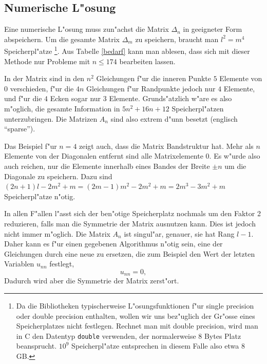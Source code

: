 \subsection{Numerische L"osung}
Eine numerische L"osung
muss zun"achst die Matrix $\Delta_n$ in geeigneter Form abspeichern.
Um die gesamte Matrix $\Delta_m$ zu speichern, braucht man $l^2=m^4$
Speicherpl"atze%
\footnote{Da die Bibliotheken typischerweise
L"osungsfunktionen f"ur single precision oder double precision
enthalten, wollen wir uns bez"uglich der Gr"osse eines Speicherplatzes
nicht festlegen. Rechnet man mit double precision, wird man in C
den Datentyp {\tt double} verwenden, der normalerweise 8 Bytes Platz
beansprucht. $10^9$ Speicherpl"atze entsprechen in diesem Falle also
etwa 8 GB.}.  Aus Tabelle \ref{bedarf} kann man ablesen, dass sich mit
dieser Methode nur Probleme mit $n\le 174$ bearbeiten lassen.

In der Matrix sind in den $n^2$ Gleichungen f"ur die inneren Punkte
$5$ Elemente von $0$ verschieden, f"ur die $4n$ Gleichungen f"ur
Randpunkte jedoch nur $4$ Elemente, und f"ur die $4$ Ecken sogar nur $3$
Elemente. Grunds"atzlich w"are es also m"oglich, die gesamte Information
in $ 5n^2+16n+12$ Speicherpl"atzen unterzubringen.  Die Matrizen $A_n$
sind also extrem d"unn besetzt (englisch ``sparse'').

Das Beispiel f"ur $n=4$ zeigt auch, dass die Matrix Bandstruktur hat. Mehr
als $n$ Elemente von der Diagonalen entfernt sind alle Matrixelemente
$0$. Es w"urde also auch reichen, nur die Elemente innerhalb eines Bandes
der Breite $\pm n$ um die Diagonale zu speichern.  Dazu sind $(2n+1)l -
2m^2+m=(2m-1)m^2-2m^2+m=2m^3-3m^2+m$ Speicherpl"atze n"otig.

In allen F"allen l"asst sich der ben"otige Speicherplatz nochmals um
den Faktor 2 reduzieren, falls man die Symmetrie der Matrix ausnutzen
kann. Dies ist jedoch nicht immer m"oglich. Die Matrix $A_n$ ist
singul"ar, genauer, sie hat Rang $l-1$.  Daher kann es f"ur einen
gegebenen Algorithmus n"otig sein, eine der Gleichungen durch eine neue
zu ersetzen, die zum Beispiel den Wert der letzten Variablen $u_{nn}$
festlegt,
\[
u_{nn}=0,
\]
Dadurch wird aber die Symmetrie der Matrix zerst"ort.

